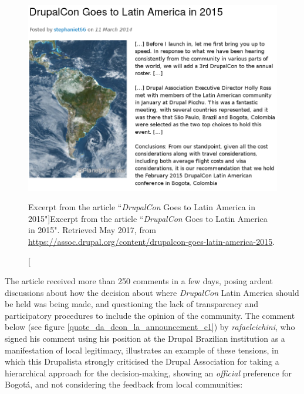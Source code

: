 \begin{figure}[H]
  \centering
\includegraphics[width=\textwidth]{img/quotes_replacement/dcon_la_2015_01b.png}
\caption[Excerpt from the article ``\textit{DrupalCon} Goes to Latin America in 2015"]{Excerpt from the article ``\textit{DrupalCon} Goes to Latin America in 2015". Retrieved  May 2017, from \url{https://assoc.drupal.org/content/drupalcon-goes-latin-america-2015}.}
\label{quote_da_dcon_la_announcement}
\end{figure}

The article received more than 250 comments in a few days, posing ardent discussions about how the decision about where \textit{DrupalCon} Latin America should be held was being made, and questioning the lack of transparency and participatory procedures to include the opinion of the community. The comment below (see figure \ref{quote_da_dcon_la_announcement_c1}) by \textsl{rafaelcichini}, who signed his comment using his position at the Drupal Brazilian institution as a manifestation of local legitimacy, illustrates an example of these tensions, in which this Drupalista strongly criticised the Drupal Association for taking a hierarchical approach for the decision-making, showing an \textit{official} preference for Bogotá, and not considering the feedback from local communities:

